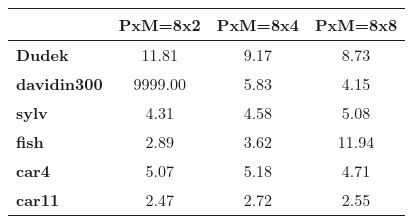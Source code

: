 \begin{tabular}{|l|c|c|c|}
\hline
&\textbf{PxM=8x2}&\textbf{PxM=8x4}&\textbf{PxM=8x8}\\\hline
\textbf{Dudek}&11.81&9.17&8.73\\\hline
\textbf{davidin300}&9999.00&5.83&4.15\\\hline
\textbf{sylv}&4.31&4.58&5.08\\\hline
\textbf{fish}&2.89&3.62&11.94\\\hline
\textbf{car4}&5.07&5.18&4.71\\\hline
\textbf{car11}&2.47&2.72&2.55\\\hline
\end{tabular}
